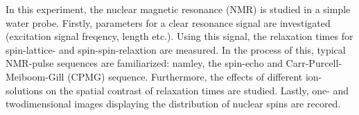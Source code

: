 \documentclass[../main.tex]{subfiles}
\begin{document}

In this experiment, the nuclear magnetic resonance (NMR) is studied in a simple water probe. Firstly, parameters for a clear resonance signal are investigated (excitation signal freqency, length etc.). Using this signal, the relaxation times for spin-lattice- and spin-spin-relaxtion are measured. In the process of this, typical NMR-pulse sequences are familiarized: namley, the spin-echo and Carr-Purcell-Meiboom-Gill (CPMG) sequence. Furthermore, the effects of different ion-solutions on the spatial contrast of relaxation times are studied. Lastly, one- and twodimensional images displaying the distribution of nuclear spins are recored.
\end{document}
